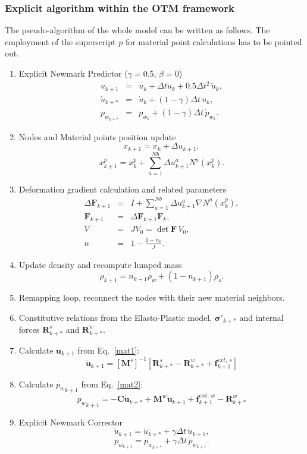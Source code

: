 \documentclass[twocolumn]{svjour3}          %
\begin{document}
\subsubsection{Explicit algorithm within the OTM framework} \label{subsec:421}
The pseudo-algorithm of the whole model can be written as follows. The employment of the superscript $p$ for material point calculations has to be pointed out.
\begin{enumerate}
\item  Explicit Newmark Predictor ($\gamma=0.5$, $\beta=0$)
\begin{eqnarray*}
u_{k+1} &=&u_k+\Delta t \dot{u}_{k}+0.5\Delta t^2 \, \ddot{u}_k, \\
\dot{u}_{k+*}&=&\dot{u}_{k}+(1-\gamma)\Delta t \,  \ddot{u}_{k}, \\
p_{w_{k+*}} &=&p_{w_k}+(1-\gamma)\Delta t \, \dot{p}_{w_k}.
\end{eqnarray*}
\item  Nodes and Material points position update
$$
x_{k+1}=x_{k}+\Delta u_{k+1},
$$
$$
x_{k+1}^p=x_{k}^p+\sum_{a=1}^{Nb}\Delta u_{k+1}^a N^a(x^p_{k}).
$$
\item Deformation gradient calculation and related parameters
\begin{eqnarray*}
\Delta \mathbf{F}_{k+1} &=& I+\sum_{a=1}^{Nb}\Delta u_{k+1}^a \nabla N^a(x_{k}^p), \\
\mathbf{F}_{k+1} &=& \Delta \mathbf{F}_{k+1} \mathbf{F}_{k}, \\
V&=&JV_0=\det \mathbf{F} \, V_0,\\
n&=&1-\frac{1-n_0}{J}.
\end{eqnarray*}
\item Update density and recompute lumped mass
$$
\rho_{k+1}=n_{k+1}\rho_{w}+(1-n_{k+1})\rho_s.
$$
\item Remapping loop, reconnect the nodes with their new material neighbors.
\item Constitutive relations from the  Elasto-Plastic model, $\boldsymbol{\sigma'}_{k+*}$ and internal forces $\boldsymbol{R}^s_{k+*}$ and $\boldsymbol{R}^w_{k+*}$.
\item Calculate $\boldsymbol{\ddot{u}}_{k+1}$ from Eq.~\eqref{mat1}:
$$
\ddot{\boldsymbol{u}}_{k+1} =  \left[\boldsymbol{M}^s \right]^{-1}\left[\boldsymbol{R}^s_{k+*}- \boldsymbol{R}^w_{k+*} + \boldsymbol{f}^{ext, \, s}_{k+1}\right]
$$
\item Calculate $\dot{p_w}_{k+1}$ from Eq.~\eqref{mat2}:
$$
\dot{p_w}_{k+1}=- \boldsymbol{C} \dot{\boldsymbol{u}}_{k+*} + \boldsymbol{M}^w \ddot{\boldsymbol{u}}_{k+1} + \boldsymbol{f}^{ext, \, w}_{k+1}-\boldsymbol{R}^{w}_{k+*}
$$
\item Explicit Newmark Corrector
$$
\dot{u}_{k+1}=\dot{u}_{k+*}+\gamma \Delta t \, \ddot{u}_{k+1},
$$
$$
{p}_{w_{k+1}}={p}_{w_{k+*}}+\gamma \Delta t \, \dot{p}_{w_{k+1}}.
$$
\end{enumerate}
\end{document}
